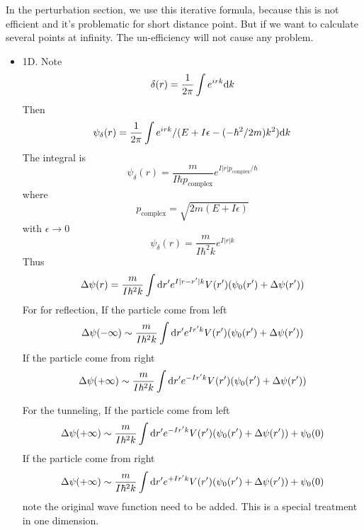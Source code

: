 \documentclass[12pt,twoside]{article}
\def\df{{\rm d}}
\begin{document}
In the perturbation section, we use this iterative formula, because this is not efficient and it's problematic for short distance point. But if we want to calculate several points at infinity. The un-efficiency will not cause any problem.
\begin{itemize}
  \item 1D. Note
  $$
  \delta(r) = \frac{1}{2\pi}\int e^{i r k} \df k
  $$
  Then
  $$
  \psi_\delta(r) = \frac{1}{2\pi}\int e^{i r k}/(E + I\epsilon -(-\hbar^2/2m)k^2) \df k
  $$
  The integral is
  $$
  \psi_\delta(r) = \frac{m}{I \hbar p_\text{complex}} e^{I|r|p_\text{complex}/\hbar}
  $$
  where
  $$
  p_\text{complex} = \sqrt{2m(E+I \epsilon)}
  $$
  with $\epsilon \rightarrow 0$
  $$
  \psi_\delta(r) = \frac{m}{I \hbar^2 k} e^{I|r|k}
  $$
  Thus
  $$
\Delta\psi(r) = \frac{m}{I \hbar^2 k}\int \df r^\prime  e^{I|r-r^\prime|k} V(r^\prime)(\psi_0(r^\prime) + \Delta\psi(r^\prime))
  $$
  For for reflection,   If the particle come from left
  $$
\Delta\psi(-\infty) \sim \frac{m}{I \hbar^2 k} \int \df r^\prime e^{Ir^\prime k} V(r^\prime)(\psi_0(r^\prime) + \Delta\psi(r^\prime))
  $$
  If the particle come from right
  $$
\Delta\psi(+\infty) \sim \frac{m}{I \hbar^2 k}\int \df r^\prime  e^{-I r^\prime k} V(r^\prime)(\psi_0(r^\prime) + \Delta\psi(r^\prime))
  $$

 For the tunneling,  If the particle come from left
  $$
\Delta\psi(+\infty) \sim \frac{m}{I \hbar^2 k} \int \df r^\prime e^{-Ir^\prime k} V(r^\prime)(\psi_0(r^\prime) + \Delta\psi(r^\prime)) + \psi_0(0)
  $$
    If the particle come from right
   $$
\Delta\psi(+\infty) \sim \frac{m}{I \hbar^2 k} \int \df r^\prime e^{+Ir^\prime k} V(r^\prime)(\psi_0(r^\prime) + \Delta\psi(r^\prime)) + \psi_0(0)
  $$
 note the original wave function need to be added. This is a special treatment in one dimension.


\end{itemize}
\end{document}
